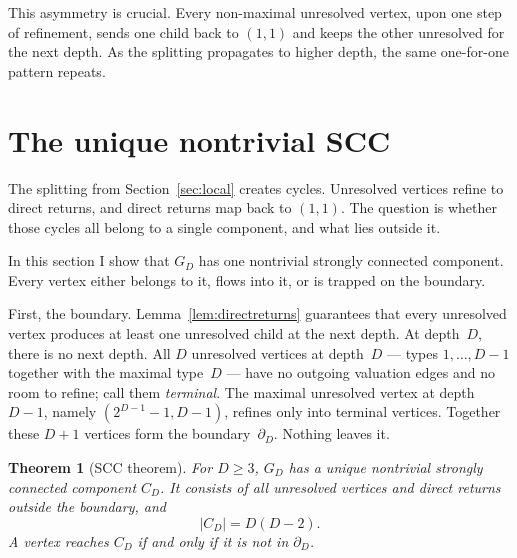 \documentclass[11pt]{amsart}
\newtheorem{theorem}{Theorem}[section]
\theoremstyle{definition}
\theoremstyle{remark}
\newcommand{\bdD}{\partial_D}
\begin{document}
This asymmetry is crucial. Every non-maximal unresolved vertex, upon one step of refinement, sends one child back to $(1,1)$ and keeps the other unresolved for the next depth. As the splitting propagates to higher depth, the same one-for-one pattern repeats.

\section{The unique nontrivial SCC}\label{sec:core}

The splitting from Section~\ref{sec:local} creates cycles. Unresolved vertices refine to direct returns, and direct returns map back to $(1,1)$. The question is whether those cycles all belong to a single component, and what lies outside it.

In this section I show that $G_D$ has one nontrivial strongly connected component. Every vertex either belongs to it, flows into it, or is trapped on the boundary.

First, the boundary.  Lemma~\ref{lem:directreturns} guarantees that every unresolved vertex produces at least one unresolved child at the next depth.  At depth~$D$, there is no next depth.  All $D$ unresolved vertices at depth~$D$ — types $1,\ldots,D-1$ together with the maximal type~$D$ — have no outgoing valuation edges and no room to refine; call them \emph{terminal}.  The maximal unresolved vertex at depth $D-1$, namely $(2^{D-1}-1,D-1)$, refines only into terminal vertices.  Together these $D+1$ vertices form the boundary~$\bdD$.  Nothing leaves it.

\begin{theorem}[SCC theorem]\label{thm:core}
For $D\ge3$, $G_D$ has a unique nontrivial strongly connected
component $C_D$.  It consists of all unresolved vertices and direct
returns outside the boundary, and
\[
|C_D|=D(D-2).
\]
A vertex reaches $C_D$ if and only if it is not in $\bdD$.
\end{theorem}
\end{document}
